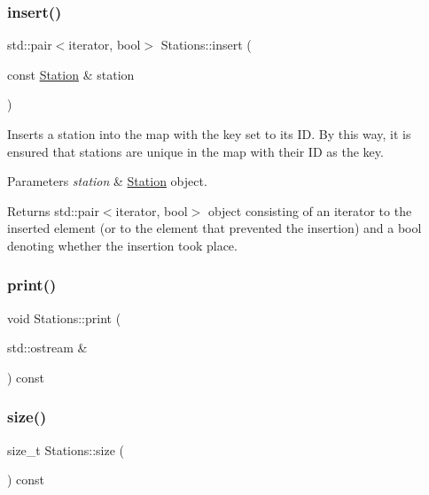 \mbox{\label{class_stations_abe1318af7b69c4eb586b099af6a1f6b8}} 
\subsubsection{\texorpdfstring{insert()}{insert()}}
{\footnotesize\ttfamily std\+::pair$<$iterator, bool$>$ Stations\+::insert (\begin{DoxyParamCaption}\item[{const \mbox{\hyperlink{class_station}{Station}} \&}]{station }\end{DoxyParamCaption})\hspace{0.3cm}{\ttfamily [inline]}}

Inserts a station into the map with the key set to its ID. By this way, it is ensured that stations are unique in the map with their ID as the key.


\begin{DoxyParams}{Parameters}
{\em station} & \mbox{\hyperlink{class_station}{Station}} object. \\
\hline
\end{DoxyParams}
\begin{DoxyReturn}{Returns}
std\+::pair$<$iterator, bool$>$ object consisting of an iterator to the inserted element (or to the element that prevented the insertion) and a bool denoting whether the insertion took place. 
\end{DoxyReturn}
\mbox{\label{class_stations_ae62b158dedf5f15c385671d15b950dc5}} 
\subsubsection{\texorpdfstring{print()}{print()}}
{\footnotesize\ttfamily void Stations\+::print (\begin{DoxyParamCaption}\item[{std\+::ostream \&}]{ }\end{DoxyParamCaption}) const}

\mbox{\label{class_stations_a5ace2f695d182f4fa0645f826f6662a7}} 
\subsubsection{\texorpdfstring{size()}{size()}}
{\footnotesize\ttfamily size\+\_\+t Stations\+::size (\begin{DoxyParamCaption}{ }\end{DoxyParamCaption}) const\hspace{0.3cm}{\ttfamily [noexcept]}}



